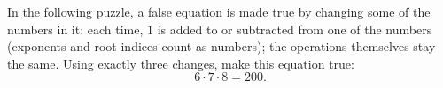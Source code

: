 In the following puzzle, a false equation is made true by changing some of the numbers in it: each time, $1$ is added to or subtracted from one of the numbers (exponents and root indices count as numbers); the operations themselves stay the same. Using exactly three changes, make this equation true:
\[6\cdot7\cdot8=200.\]
